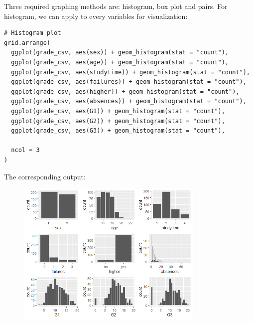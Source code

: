 \documentclass[a4paper]{article}
\numberwithin{equation}{section}
\begin{document}
Three required graphing methods are: histogram, box plot and pairs. For histogram, we can apply to every variables for visualization:
\begin{mdframed}[leftline=false,rightline=false,backgroundcolor=magenta!10,nobreak=true]
  \begin{verbatim}
# Histogram plot
grid.arrange(
  ggplot(grade_csv, aes(sex)) + geom_histogram(stat = "count"),
  ggplot(grade_csv, aes(age)) + geom_histogram(stat = "count"),
  ggplot(grade_csv, aes(studytime)) + geom_histogram(stat = "count"),
  ggplot(grade_csv, aes(failures)) + geom_histogram(stat = "count"),
  ggplot(grade_csv, aes(higher)) + geom_histogram(stat = "count"),
  ggplot(grade_csv, aes(absences)) + geom_histogram(stat = "count"),
  ggplot(grade_csv, aes(G1)) + geom_histogram(stat = "count"),
  ggplot(grade_csv, aes(G2)) + geom_histogram(stat = "count"),
  ggplot(grade_csv, aes(G3)) + geom_histogram(stat = "count"),

  ncol = 3
)
  \end{verbatim}
\end{mdframed}

The corresponding output:

\begin{figure}[H]
  \centering
  \includegraphics[width=0.8\textwidth]{hist.png}
\end{figure}
\end{document}
